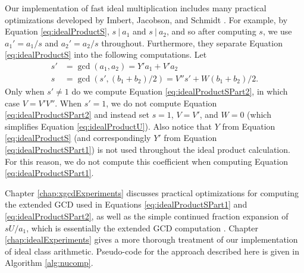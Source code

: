 \documentclass{ucalgthes1}
\theoremstyle{definition}
\begin{document}
Our implementation of fast ideal multiplication includes many practical optimizations developed by Imbert, Jacobson, and Schmidt \cite[Algorithm~6]{Imbert2010}.  For example, by Equation \eqref{eq:idealProductS}, $s ~|~ a_1$ and $s ~|~ a_2$, and so after computing $s$, we use ${a_1}' = a_1/s$ and ${a_2}' = a_2/s$ throughout.  Furthermore, they separate Equation \eqref{eq:idealProductS} into the following computations. Let
\begin{align}
s' &= \gcd(a_1, a_2) = Y'a_1 + V'a_2 \label{eq:idealProductSPart1} \\
s  &= \gcd(s', (b_1 + b_2)/2) = V''s'+W(b_1+b_2)/2. \label{eq:idealProductSPart2} 
\end{align}
Only when $s' \neq 1$ do we compute Equation \eqref{eq:idealProductSPart2}, in which case $V = V'V''$.  When $s' = 1$, we do not compute Equation \eqref{eq:idealProductSPart2} and instead set $s = 1$, $V = V'$, and $W=0$ (which simplifies Equation \eqref{eq:idealProductU}).  Also notice that $Y$ from Equation \eqref{eq:idealProductS} (and correspondingly $Y'$ from Equation \eqref{eq:idealProductSPart1}) is not used throughout the ideal product calculation.  For this reason, we do not compute this coefficient when computing Equation \eqref{eq:idealProductSPart1}.

Chapter \ref{chap:xgcdExperiments} discusses practical optimizations for computing the extended GCD used in Equations \eqref{eq:idealProductSPart1} and \eqref{eq:idealProductSPart2}, as well as the simple continued fraction expansion of $sU/a_1$, which is essentially the extended GCD computation \cite[\S 3.2]{Jacobson2009}.  Chapter \ref{chap:idealExperiments} gives a more thorough treatment of our implementation of ideal class arithmetic.  Pseudo-code for the approach described here is given in Algorithm \ref{alg:nucomp}.
\end{document}
